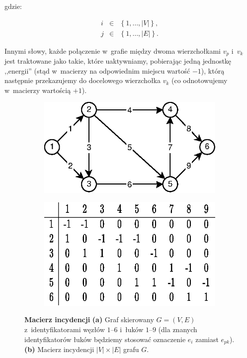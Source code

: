 gdzie:

\begin{equation}
	\begin{array}{lll}
	i & \in & \left\{ 1, \ldots, \left| V \right| \right\} \textrm{,} \\
	j & \in & \left\{ 1, \ldots, \left| E \right| \right\} \textrm{.}
	\end{array}
\end{equation}

Innymi słowy, każde połączenie w~grafie między dwoma wierzchołkami $v_{p}$ i~$v_{k}$ jest traktowane jako takie, które uaktywniamy, pobierając jedną jednostkę ,,energii'' (stąd w~macierzy na odpowiednim miejscu wartość $-1$), którą następnie przekazujemy do docelowego wierzchołka $v_{k}$ (co odnotowujemy w~macierzy wartością $+1$).

\begin{figure}[!htbp]
	\centering
	\begin{subfigure}[b]{0.45\textwidth}
		\includegraphics[width=\textwidth]{Chapter_I/1/1_1a.eps}
		\caption{}
	\end{subfigure}
	\qquad
	\begin{subfigure}[b]{0.45\textwidth}
		\includegraphics[width=\textwidth]{Chapter_I/1/1_1b.eps}
		\caption{}
	\end{subfigure}
	\caption{\textbf{Macierz incydencji} \textbf{(a)} Graf skierowany $G = \left( V, E \right)$ z~identyfikatorami węzłów $1$--$6$ i~łuków $1$--$9$ (dla znanych identyfikatorów łuków będziemy stosować oznaczenie $e_{i}$ zamiast $e_{pk}$). \textbf{(b)} Macierz incydencji $ \left| V \right| \times \left| E \right| $ grafu $G$.}\label{fig:incidenceMatrix}
\end{figure}

